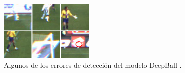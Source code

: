 \begin{figure}
    \centering
    \includegraphics[width=0.4\textwidth]{images/errorDeepball.png}
    \caption{Algunos de los errores de detección del modelo DeepBall \cite{art:DeepBall}.}
    \label{fig:deepballerror}
\end{figure}

\newpage